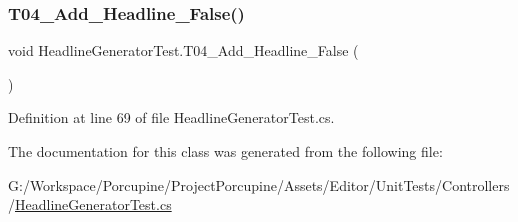 \subsubsection{\texorpdfstring{T04\+\_\+\+Add\+\_\+\+Headline\+\_\+\+False()}{T04\_Add\_Headline\_False()}}
{\footnotesize\ttfamily void Headline\+Generator\+Test.\+T04\+\_\+\+Add\+\_\+\+Headline\+\_\+\+False (\begin{DoxyParamCaption}{ }\end{DoxyParamCaption})}



Definition at line 69 of file Headline\+Generator\+Test.\+cs.



The documentation for this class was generated from the following file\+:\begin{DoxyCompactItemize}
\item 
G\+:/\+Workspace/\+Porcupine/\+Project\+Porcupine/\+Assets/\+Editor/\+Unit\+Tests/\+Controllers/\hyperlink{_headline_generator_test_8cs}{Headline\+Generator\+Test.\+cs}\end{DoxyCompactItemize}
